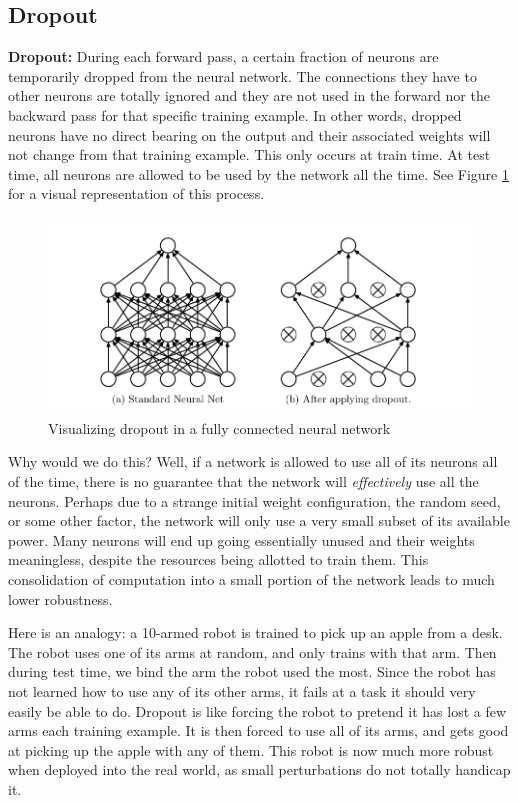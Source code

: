 \subsection{Dropout}
\begin{flushleft}
    \large \textbf{Dropout:} During each forward pass, a certain fraction of neurons are temporarily dropped from the neural network. The connections they have to other neurons are totally ignored and they are not used in the forward nor the backward pass for that specific training example. In other words, dropped neurons have no direct bearing on the output and their associated weights will not change from that training example. This only occurs at train time. At test time, all neurons are allowed to be used by the network all the time. See Figure \ref{fig:dropout} for a visual representation of this process.

    \begin{figure}[H]
        \centering
        \includegraphics[width=1\linewidth]{dl/dropout.png}
        \caption{Visualizing dropout in a fully connected neural network}
        \label{fig:dropout}
    \end{figure}

    Why would we do this? Well, if a network is allowed to use all of its neurons all of the time, there is no guarantee that the network will \textit{effectively} use all the neurons. Perhaps due to a strange initial weight configuration, the random seed, or some other factor, the network will only use a very small subset of its available power. Many neurons will end up going essentially unused and their weights meaningless, despite the resources being allotted to train them. This consolidation of computation into a small portion of the network leads to much lower robustness. \break
    
    Here is an analogy: a 10-armed robot is trained to pick up an apple from a desk. The robot uses one of its arms at random, and only trains with that arm. Then during test time, we bind the arm the robot used the most. Since the robot has not learned how to use any of its other arms, it fails at a task it should very easily be able to do. Dropout is like forcing the robot to pretend it has lost a few arms each training example. It is then forced to use all of its arms, and gets good at picking up the apple with any of them. This robot is now much more robust when deployed into the real world, as small perturbations do not totally handicap it. \break


\end{flushleft}
